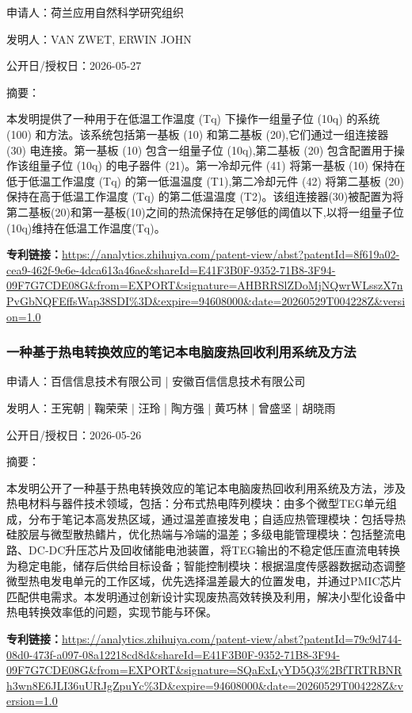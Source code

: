 \documentclass[12pt,a4paper]{ctexart}
\begin{document}
申请人：荷兰应用自然科学研究组织

发明人：VAN ZWET, ERWIN JOHN

公开日/授权日：2026-05-27

摘要：

本发明提供了一种用于在低温工作温度 (Tq) 下操作一组量子位 (10q) 的系统 (100) 和方法。该系统包括第一基板 (10) 和第二基板 (20),它们通过一组连接器 (30) 电连接。第一基板 (10) 包含一组量子位 (10q),第二基板 (20) 包含配置用于操作该组量子位 (10q) 的电子器件 (21)。第一冷却元件 (41) 将第一基板 (10) 保持在低于低温工作温度 (Tq) 的第一低温温度 (T1),第二冷却元件 (42) 将第二基板 (20) 保持在高于低温工作温度 (Tq) 的第二低温温度 (T2)。该组连接器(30)被配置为将第二基板(20)和第一基板(10)之间的热流保持在足够低的阈值以下,以将一组量子位(10q)维持在低温工作温度(Tq)。

\noindent\textbf{专利链接：}\url{https://analytics.zhihuiya.com/patent-view/abst?patentId=8f619a02-cea9-462f-9e6e-4dca613a46ae&shareId=E41F3B0F-9352-71B8-3F94-09F7G7CDE08G&from=EXPORT&signature=AHBRRSlZDoMjNQwrWLsszX7nPvGbNQFEffsWap38SDI%3D&expire=94608000&date=20260529T004228Z&version=1.0}

\subsubsection{ 一种基于热电转换效应的笔记本电脑废热回收利用系统及方法 }

申请人：百信信息技术有限公司 | 安徽百信信息技术有限公司

发明人：王宪朝 | 鞠荣荣 | 汪玲 | 陶方强 | 黄巧林 | 曾盛坚 | 胡晓雨

公开日/授权日：2026-05-26

摘要：

本发明公开了一种基于热电转换效应的笔记本电脑废热回收利用系统及方法，涉及热电材料与器件技术领域，包括：分布式热电阵列模块：由多个微型TEG单元组成，分布于笔记本高发热区域，通过温差直接发电；自适应热管理模块：包括导热硅胶层与微型散热鳍片，优化热端与冷端的温差；多级电能管理模块：包括整流电路、DC‑DC升压芯片及回收储能电池装置，将TEG输出的不稳定低压直流电转换为稳定电能，储存后供给目标设备；智能控制模块：根据温度传感器数据动态调整微型热电发电单元的工作区域，优先选择温差最大的位置发电，并通过PMIC芯片匹配供电需求。本发明通过创新设计实现废热高效转换及利用，解决小型化设备中热电转换效率低的问题，实现节能与环保。

\noindent\textbf{专利链接：}\url{https://analytics.zhihuiya.com/patent-view/abst?patentId=79c9d744-08d0-473f-a097-08a12218cd8d&shareId=E41F3B0F-9352-71B8-3F94-09F7G7CDE08G&from=EXPORT&signature=SQaExLyYD5Q3%2BfTRTRBNRh3wn8E6JLI36uURJgZpuYc%3D&expire=94608000&date=20260529T004228Z&version=1.0}
\end{document}
